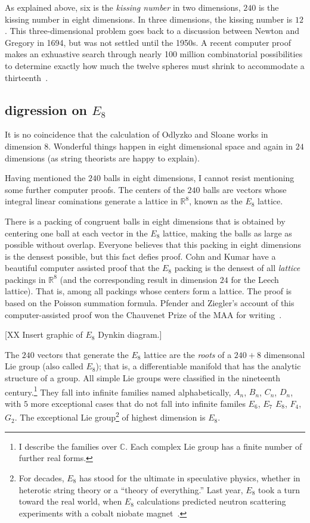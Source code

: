 \documentclass{llncs}
\newcommand{\ring}[1]{\mathbb{#1}}
\begin{document}
As explained above, six is the {\it kissing number} in two dimensions,
$240$ is the kissing number in eight dimensions. In three dimensions,
the kissing number is $12$.  This three-dimensional problem goes back
to a discussion between Newton and Gregory in 1694, but was not
settled until the 1950s.  A recent computer proof makes an exhuastive
search through nearly 100 million combinatorial possibilities to
determine exactly how much the twelve spheres must shrink to
accommodate a thirteenth~\cite{Musin-Tarasov}.



\subsection{digression on $E_8$}

It is no coincidence that the calculation of Odlyzko and Sloane works
in dimension $8$.  Wonderful things happen in eight dimensional space
and again in $24$ dimensions (as string theorists are happy to
explain).

Having mentioned the $240$ balls in eight dimensions, I cannot resist
mentioning some further computer proofs.  The centers of the $240$ balls
are vectors whose integral linear cominations generate 
a lattice in $\ring{R}^8$, known as the $E_8$ lattice.

There is a packing of congruent balls in eight dimensions that is
obtained by centering one ball at each vector in the $E_8$ lattice,
making the balls as large as possible without overlap.  Everyone
believes that this packing in eight dimensions is the densest
possible, but this fact defies proof.  Cohn and Kumar have a beautiful
computer assisted proof that the $E_8$ packing is the densest of all
{\it lattice} packings in $\ring{R}^8$ (and the corresponding result in
dimension $24$ for the Leech lattice).  That is, among all packings
whose centers form a lattice.  The proof is based on the Poisson
summation formula.  Pfender and Ziegler's account of this
computer-assisted proof won the Chauvenet Prize of the MAA for
writing~\cite{PZ}.


[XX Insert graphic of $E_8$ Dynkin diagram.]

The $240$ vectors that generate the $E_8$ lattice are the {\it roots}
of a $240+8$ dimensonal Lie group (also called $E_8$); that is, a
differentiable manifold that has the analytic structure of a group.
All simple Lie groups were classified in the nineteenth
century.\footnote{I describe the families over $\ring{C}$.  Each
  complex Lie group has a finite number of further real forms.}  They
fall into infinite families named alphabetically, $A_n$, $B_n$, $C_n$,
$D_n$, with $5$ more exceptional cases that do not fall into infinite
familes $E_6$, $E_7$ $E_8$, $F_4$, $G_2$.  The exceptional Lie
group\footnote{For decades, $E_8$ has stood for the ultimate in
  speculative physics, whether in heterotic string theory or a
  ``theory of everything.''  Last year, $E_8$ took a turn toward the
  real world, when $E_8$ calculations predicted neutron scattering
  experiments with a cobalt niobate magnet~\cite{BGE8}.} of highest
dimension is $E_8$.
\end{document}
